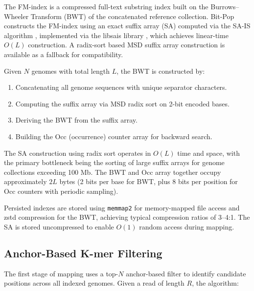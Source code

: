 \documentclass[utf8]{article}
\begin{document}
The FM-index \citep{burrows1994,ferrada2007} is a compressed full-text substring index built on the Burrows--Wheeler Transform (BWT) of the concatenated reference collection. Bit-Pop constructs the FM-index using an exact suffix array (SA) computed via the SA-IS algorithm \citep{karkkainen2003}, implemented via the libsais library \citep{libsais}, which achieves linear-time $O(L)$ construction. A radix-sort based MSD suffix array construction is available as a fallback for compatibility.

Given $N$ genomes with total length $L$, the BWT is constructed by:
\begin{enumerate}
    \item Concatenating all genome sequences with unique separator characters.
    \item Computing the suffix array via MSD radix sort on 2-bit encoded bases.
    \item Deriving the BWT from the suffix array.
    \item Building the Occ (occurrence) counter array for backward search.
\end{enumerate}

The SA construction using radix sort operates in $O(L)$ time and space, with the primary bottleneck being the sorting of large suffix arrays for genome collections exceeding 100 Mb. The BWT and Occ array together occupy approximately $2L$ bytes (2 bits per base for BWT, plus 8 bits per position for Occ counters with periodic sampling).

Persisted indexes are stored using \texttt{memmap2} for memory-mapped file access and zstd compression for the BWT, achieving typical compression ratios of 3--4:1. The SA is stored uncompressed to enable $O(1)$ random access during mapping.

\subsection{Anchor-Based K-mer Filtering}

The first stage of mapping uses a top-$N$ anchor-based filter to identify candidate positions across all indexed genomes. Given a read of length $R$, the algorithm:
\end{document}
